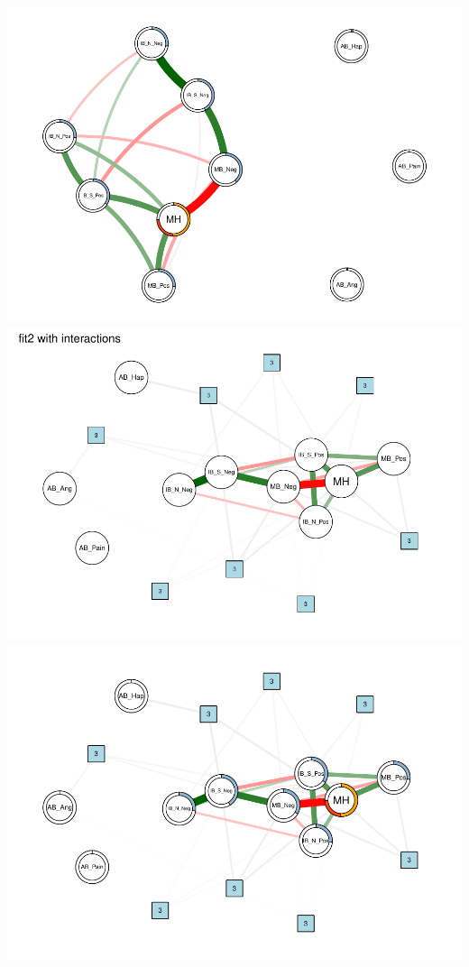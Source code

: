 \documentclass[man,floatsintext]{apa6}
\begin{document}
\includegraphics{script_files/figure-latex/unnamed-chunk-1-1.pdf}
\includegraphics{script_files/figure-latex/unnamed-chunk-1-2.pdf}
\includegraphics{script_files/figure-latex/unnamed-chunk-1-3.pdf}
\end{document}
